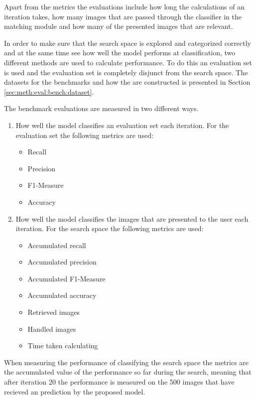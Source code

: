 Apart from the metrics the evaluations include how long the calculations of an iteration takes, how many images that are passed through the classifier in the matching module and how many of the presented images that are relevant.   

In order to make sure that the search space is explored and categorized correctly and at the same time see how well the model performs at classification, two different methods are used to calculate performance. To do this an evaluation set is used and the evaluation set is completely disjunct from the search space. The datasets for the benchmarks and how the are constructed is presented in Section \ref{sec:meth:eval:bench:dataset}. 

The benchmark evaluations are measured in two different ways.
\begin{enumerate}
\item How well the model classifies an evaluation set each iteration. For the evaluation set the following metrics are used: 
	\begin{itemize}
		\item Recall
		\item Precision
		\item F1-Measure
		\item Accuracy
	\end{itemize}   
\item How well the model classifies the images that are presented to the user each iteration. For the search space the following metrics are used:
	\begin{itemize}
		\item Accumulated recall 
		\item Accumulated precision
		\item Accumulated F1-Measure
		\item Accumulated accuracy
		\item Retrieved images
		\item Handled images
		\item Time taken calculating
	\end{itemize}   
\end{enumerate}
\medskip
When measuring the performance of classifying the search space the metrics are the accumulated value of the performance so far during the search, meaning that after iteration 20 the performance is measured on the 500 images that have recieved an prediction by the proposed model.

